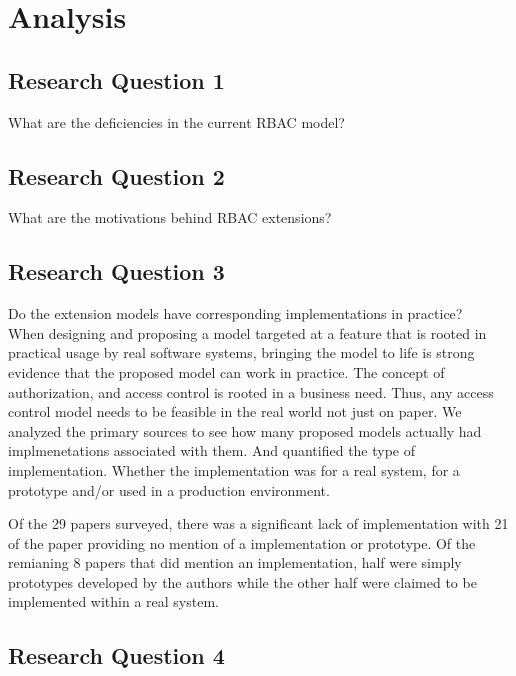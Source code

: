 \section{Analysis} \label{sec:analysis}

\subsection{Research Question 1}

What are the deficiencies in the current RBAC model? \\

\subsection{Research Question 2}

What are the motivations behind RBAC extensions? \\

\subsection{Research Question 3}

Do the extension models have corresponding implementations in practice? \\

When designing and proposing a model targeted at a feature that is rooted in practical
usage by real software systems, bringing the model to life is strong evidence that the
proposed model can work in practice.  The concept of authorization, and access control
is rooted in a business need.  Thus, any access control model needs to be feasible
in the real world not just on paper.  We analyzed the primary sources to see how many
proposed models actually had implmenetations associated with them.  And quantified the
type of implementation.  Whether the implementation was for a real system, for a prototype
and/or used in a production environment.

Of the 29 papers surveyed, there was a significant lack of implementation with 21 of the paper providing no
mention of a implementation or prototype.  Of the remianing 8 papers that did mention an implementation, half 
were simply prototypes developed by the authors while the other half were claimed to be implemented within a real
system.

\subsection{Research Question 4}

